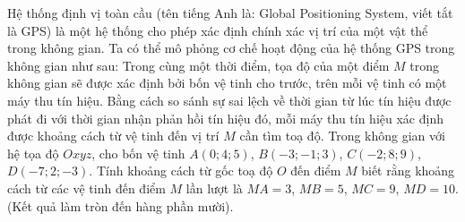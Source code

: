 \begin{bt}%
	Hệ thống định vị toàn cầu (tên tiếng Anh là: Global Positioning System, viết tắt là GPS) là một hệ thống cho phép xác định chính xác vị trí của một vật thể trong không gian. Ta có thể mô phỏng cơ chế hoạt động của hệ thống GPS trong không gian như sau: Trong cùng một thời điểm, tọa độ của một điểm $M$ trong không gian sẽ được xác định bởi bốn vệ tinh cho trước, trên mỗi vệ tinh có một máy thu tín hiệu. Bằng cách so sánh sự sai lệch về thời gian từ lúc tín hiệu được phát đi với thời gian nhận phản hồi tín hiệu đó, mỗi máy thu tín hiệu xác định được khoảng cách từ vệ tinh đến vị trí $M$ cần tìm toạ độ. Trong không gian với hệ tọa độ $Oxyz$, cho bốn vệ tinh $A(0; 4; 5)$, $B(-3;-1; 3)$, $C(-2; 8; 9)$, $D(-7; 2;-3)$. Tính khoảng cách từ gốc toạ độ $O$ đến điểm $M$ biết rằng khoảng cách từ các vệ tinh đến điểm $M$ lần lượt là $MA=3$, $MB=5$, $MC=9$, $MD=10$. (Kết quả làm tròn đến hàng phần mười).
\end{bt}


